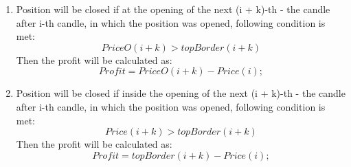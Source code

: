 \documentclass{tewiart}
\begin{document}
\begin{enumerate}
\item Position will be closed if at the opening of the next (i + k)-th - the candle after i-th candle, in which the position was opened, following condition is met: 
\begin{equation}
PriceO(i+k) >topBorder(i+k)
\end{equation} 
Then the profit will be calculated as:
\begin{equation}
Profit =PriceO (i+k) -  Price(i) ;
\end{equation}

\item Position will be closed if inside the opening of the next (i + k)-th - the candle after i-th candle, in which the position was opened, following condition is met: 
\begin{equation}
Price(i+k) >topBorder(i+k)
\end{equation} 
Then the profit will be calculated as:
\begin{equation}
Profit =topBorder (i+k) -  Price(i) ;
\end{equation}

\end{enumerate}
\end{document}
